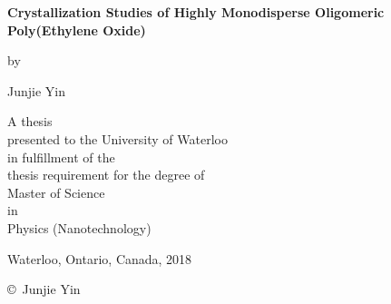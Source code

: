 
\pagestyle{empty}

\begin{titlepage}
        \begin{center}
        \vspace*{1.0cm}

        \Huge
        {\bf Crystallization Studies of Highly Monodisperse Oligomeric Poly(Ethylene Oxide) }

        \vspace*{1.0cm}

        \normalsize
        by \\

        \vspace*{1.0cm}

        \Large
        Junjie Yin \\

        \vspace*{3.0cm}

        \normalsize
        A thesis \\
        presented to the University of Waterloo \\ 
        in fulfillment of the \\
        thesis requirement for the degree of \\
        Master of Science \\
        in \\
        Physics (Nanotechnology)\\

        \vspace*{2.0cm}

        Waterloo, Ontario, Canada, 2018 \\

        \vspace*{1.0cm}

        \copyright\ Junjie Yin \\
        \end{center}
\end{titlepage}

\pagestyle{plain}
\setcounter{page}{2}

\cleardoublepage %
 
